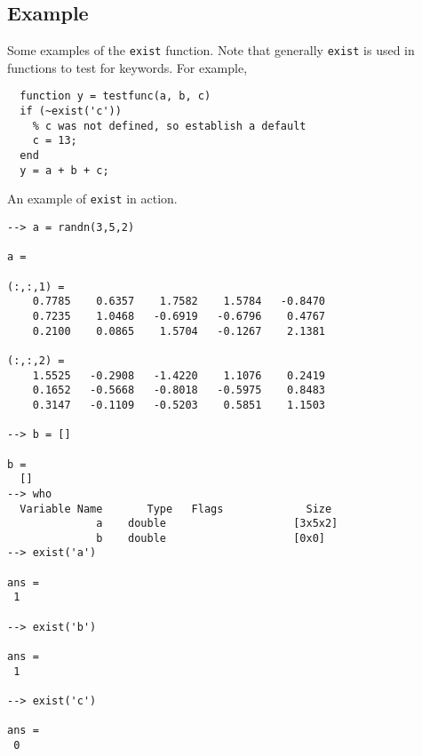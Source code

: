 \subsection{Example}

Some examples of the \verb|exist| function.  Note that generally \verb|exist|
is used in functions to test for keywords.  For example,
\begin{verbatim}
  function y = testfunc(a, b, c)
  if (~exist('c'))
    % c was not defined, so establish a default
    c = 13;
  end
  y = a + b + c;
\end{verbatim}
An example of \verb|exist| in action.
\begin{verbatim}
--> a = randn(3,5,2)

a = 

(:,:,1) = 
    0.7785    0.6357    1.7582    1.5784   -0.8470 
    0.7235    1.0468   -0.6919   -0.6796    0.4767 
    0.2100    0.0865    1.5704   -0.1267    2.1381 

(:,:,2) = 
    1.5525   -0.2908   -1.4220    1.1076    0.2419 
    0.1652   -0.5668   -0.8018   -0.5975    0.8483 
    0.3147   -0.1109   -0.5203    0.5851    1.1503 

--> b = []

b = 
  []
--> who
  Variable Name       Type   Flags             Size
              a    double                    [3x5x2]
              b    double                    [0x0]
--> exist('a')

ans = 
 1 

--> exist('b')

ans = 
 1 

--> exist('c')

ans = 
 0 
\end{verbatim}
